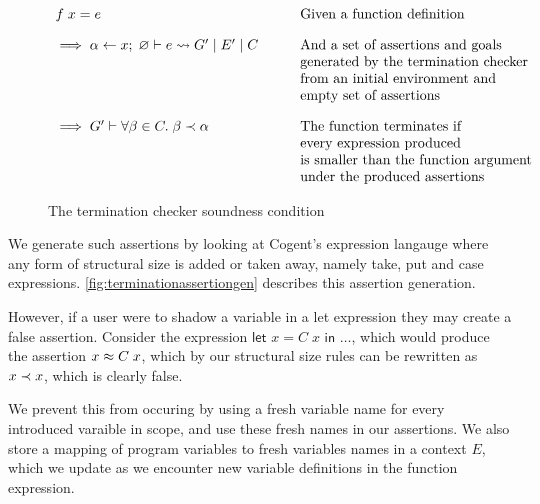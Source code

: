 \begin{figure}
    \centering
    \[
        \begin{array}{ll}
            f\; x = e              
                & \text{Given a function definition} \\[10pt]
            \implies \alpha \leftarrow x;\; \varnothing 
                \vdash e \rightsquigarrow G'\; |\; E'\; |\; C
                \hspace{2em}
                & \text{And a set of assertions and goals} \\
                & \text{generated by the termination checker} \\
                & \text{from an initial environment and} \\
                & \text{empty set of assertions} \\[10pt]
            \implies G' \vdash \forall \beta \in C.\; \beta \prec \alpha
                & \text{The function terminates if} \\
                & \text{every expression produced} \\
                & \text{is smaller than the function argument} \\
                & \text{under the produced assertions}
        \end{array}
    \]
    
    \caption{The termination checker soundness condition}
    \label{fig:terminationcondition}
\end{figure}

We generate such assertions by looking at Cogent's expression langauge 
where any form of structural size is added or taken away, namely
\textsf{take}, \textsf{put} and \textsf{case} expressions.
\autoref{fig:terminationassertiongen} describes this assertion generation.

However, if a user were to shadow a variable in a let expression they may
create a false assertion. Consider the expression 
$\textsf{let } x = C\; x \textsf{ in } \dots$, which would produce the
assertion $x \approx C\; x$, which by our structural size rules can be rewritten as
$x \prec x$, which is clearly false.

We prevent this from occuring by using a fresh variable name for every
introduced varaible in scope, and use these fresh names in our assertions.
We also store a mapping of program variables to fresh variables names in a
context $E$, which we update as we encounter new variable definitions in the
function expression.


